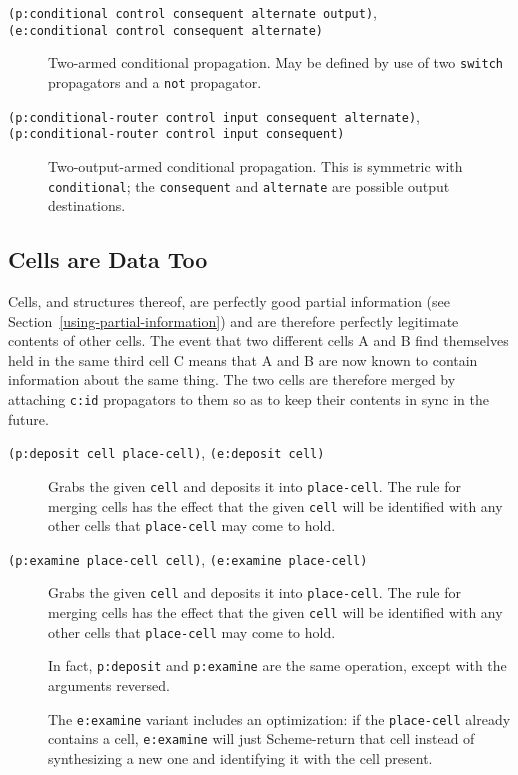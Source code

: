 \documentclass[12pt,letterpaper,english]{article}
\begin{document}
\begin{description}
\item[{\texttt{(p:conditional control consequent alternate output)},}]
\item[{\texttt{(e:conditional control consequent alternate)}}] \leavevmode 
Two-armed conditional propagation.  May be defined by use of two
\texttt{switch} propagators and a \texttt{not} propagator.

\item[{\texttt{(p:conditional-router control input consequent alternate)},}]
\item[{\texttt{(p:conditional-router control input consequent)}}] \leavevmode 
Two-output-armed conditional propagation.  This is symmetric with
\texttt{conditional}; the \texttt{consequent} and \texttt{alternate} are possible
output destinations.

\end{description}



\hypertarget{cells-are-data-too}{}
\subsection{Cells are Data Too}
\label{cells-are-data-too}

Cells, and structures thereof, are perfectly good partial information
(see Section~\ref{using-partial-information})
and are therefore perfectly legitimate contents of other
cells.  The event that two different cells A and B find themselves
held in the same third cell C means that A and B are now known to
contain information about the same thing.  The two cells are therefore
merged by attaching \texttt{c:id} propagators to them so as to keep their
contents in sync in the future.
\begin{description}
\item[{\texttt{(p:deposit cell place-cell)}, \texttt{(e:deposit cell)}}] \leavevmode 
Grabs the given \texttt{cell} and deposits it into \texttt{place-cell}.  The
rule for merging cells has the effect that the given \texttt{cell} will
be identified with any other cells that \texttt{place-cell} may come to
hold.

\item[{\texttt{(p:examine place-cell cell)}, \texttt{(e:examine place-cell)}}] \leavevmode 
Grabs the given \texttt{cell} and deposits it into \texttt{place-cell}.  The
rule for merging cells has the effect that the given \texttt{cell} will
be identified with any other cells that \texttt{place-cell} may come to
hold.

In fact, \texttt{p:deposit} and \texttt{p:examine} are the same operation,
except with the arguments reversed.

The \texttt{e:examine} variant includes an optimization: if the
\texttt{place-cell} already contains a cell, \texttt{e:examine} will just
Scheme-return that cell instead of synthesizing a new one and
identifying it with the cell present.

\end{description}
\end{document}
